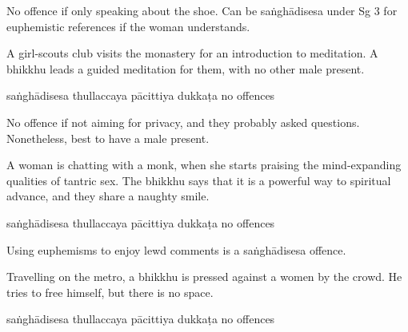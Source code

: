\begin{exam}{\autoExamName}
\begin{problem*}
\begin{parts}
  \bigskip

  \begin{solution}
    No offence if only speaking about the shoe.
    Can be saṅghādisesa under Sg 3 for euphemistic references if the woman understands.
  \end{solution}

  \item A girl-scouts club visits the monastery for an introduction to
    meditation. A bhikkhu leads a guided meditation for them, with no other male
    present.

    \bigskip

    \begin{answers}{5}
      \bChoices
       saṅghādisesa\eAns
       thullaccaya\eAns
       pācittiya\eAns
       dukkaṭa\eAns
       no offences\eAns
      \eChoices
    \end{answers}

    \begin{solution}
      No offence if not aiming for privacy, and they probably asked questions.
      Nonetheless, best to have a male present.
    \end{solution}

    \bigskip

  \item A woman is chatting with a monk, when she starts praising the
    mind-expanding qualities of tantric sex. The bhikkhu says that it is a
    powerful way to spiritual advance, and they share a naughty smile.

    \bigskip

    \begin{answers}{5}
      \bChoices
       saṅghādisesa\eAns
       thullaccaya\eAns
       pācittiya\eAns
       dukkaṭa\eAns
       no offences\eAns
      \eChoices
    \end{answers}

    \begin{solution}
      Using euphemisms to enjoy lewd comments is a saṅghādisesa offence.
    \end{solution}

    \bigskip

  \item Travelling on the metro, a bhikkhu is pressed against a women by the
    crowd. He tries to free himself, but there is no space.

    \bigskip

    \begin{answers}{5}
      \bChoices
       saṅghādisesa\eAns
       thullaccaya\eAns
       pācittiya\eAns
       dukkaṭa\eAns
       no offences\eAns
      \eChoices
    \end{answers}


\end{parts}
\end{problem*}
\end{exam}
